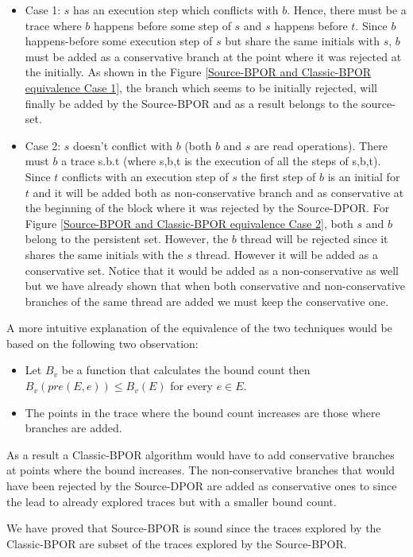 \begin{itemize}

\item Case 1: $s$ has an execution step which conflicts with $b$. Hence, there must be a trace where $b$ happens before some step of $s$ and $s$ 
happens before $t$. Since $b$ happens-before some execution step of $s$ but share the same initials with $s$, $b$ must be added as a conservative
branch at the point where it was rejected at the initially.
As shown in the Figure \ref{Source-BPOR and Classic-BPOR equivalence Case 1}, the branch which seems to be initially rejected, 
will finally be added by the Source-BPOR and as a result belongs to the source-set. 
   
\item Case 2: 
   $s$ doesn’t conflict with $b$ (both $b$ and $s$ are read operations). There must $b$ a trace s.b.t (where s,b,t is the execution
   of all the steps of s,b,t). 
   Since $t$ conflicts with an execution step of $s$ the first step of $b$ is an initial for $t$ and it will be added both as non-conservative branch and 
   as conservative at the beginning of the block where it was rejected by the Source-DPOR. For Figure \ref{Source-BPOR and Classic-BPOR equivalence Case 2}, both $s$ and $b$ belong to the persistent set. However,
   the $b$ thread will be rejected since it shares the same initials with the $s$ thread. However it will be added as a conservative set. Notice that it would be added as a
   non-conservative as well but we have already shown that when both conservative and non-conservative branches of the same thread are added we must keep the conservative one.

\end{itemize}
   
A more intuitive explanation of the equivalence of the two techniques would be based on the following two observation:
\begin{itemize}
  \item Let $B_v$ be a function that calculates the bound count then $B_v(pre(E,e)) \leq B_v(E)$ for every $e \in E$.
  \item The points in the trace where the bound count increases are those where branches are added.
\end{itemize}

As a result a Classic-BPOR algorithm would have to add conservative branches at points where the bound increases. The non-conservative branches that would have been
rejected by the Source-DPOR are added as conservative ones to since the lead to already explored traces but with a smaller bound count.

We have proved that Source-BPOR is sound since the traces explored by the Classic-BPOR are subset of the traces explored by the Source-BPOR.
